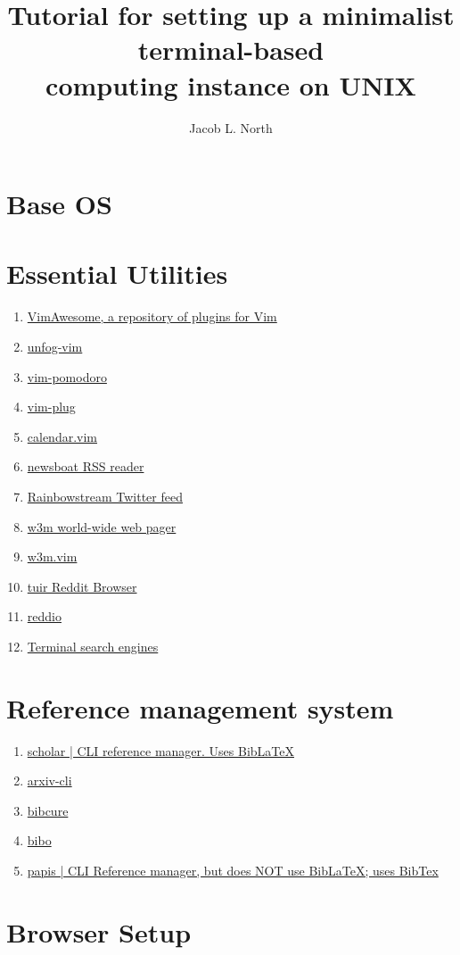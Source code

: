 \documentclass{article}
\title{Tutorial for setting up a minimalist terminal-based\\computing instance on UNIX}
\author{Jacob L. North}
\begin{document}
\maketitle

\vfill

\tableofcontents

\vfill

\section{Base OS}

\section{Essential Utilities}
\begin{enumerate}
    \item \href{https://vimawesome.com/}{VimAwesome, a repository of plugins for Vim}
    \item \href{https://github.com/unfog-io/unfog-vim}{unfog-vim}
    \item \href{https://github.com/mnick/vim-pomodoro}{vim-pomodoro}
    \item \href{https://github.com/junegunn/vim-plug}{vim-plug}
    \item \href{https://github.com/itchyny/calendar.vim}{calendar.vim}
    \item \href{https://github.com/newsboat/newsboat}{newsboat RSS reader}
    \item \href{https://github.com/orakaro/rainbowstream}{Rainbowstream Twitter feed}
    \item \href{https://github.com/tats/w3m}{w3m world-wide web pager}
    \item \href{https://github.com/yuratomo/w3m.vim}{w3m.vim}
    \item \href{https://gitlab.com/ajak/tuir}{tuir Reddit Browser}
    \item \href{https://gitlab.com/aaronNG/reddio}{reddio}
    \item \href{https://vitux.com/four-web-browsers-for-the-linux-command-line/}{Terminal search engines}
\end{enumerate}

\section{Reference management system}
\begin{enumerate}
    \item \href{https://github.com/cgxeiji/scholar/}{scholar | CLI reference manager. Uses BibLaTeX}
    \item \href{https://github.com/jacquerie/arxiv-cli}{arxiv-cli}
    \item \href{https://github.com/bibcure/bibcure}{bibcure}
    \item \href{https://github.com/Nagasaki45/bibo}{bibo}
    \item \href{https://github.com/papis/papis}{papis | CLI Reference manager, but does NOT use BibLaTeX; uses BibTex}
\end{enumerate}

\section{Browser Setup}
\end{document}
